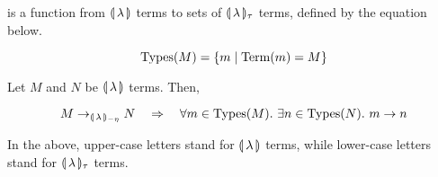 \begin{definition}
   is a function from $\llparenthesis \, \lambda \, \rrparenthesis$ terms to sets of
  $\llparenthesis \, \lambda \, \rrparenthesis_\tau$ terms, defined by the equation below.
  
  $$
  \operatorname{Types}(M) = \{ m \mid \operatorname{Term}(m) = M \}
  $$
\end{definition}

\begin{lemma}
  \label{lem:infinite-chains}
  Let $M$ and $N$ be $\llparenthesis \, \lambda \, \rrparenthesis$ terms. Then,

  $$
  M \to_{{\llparenthesis \, \lambda \, \rrparenthesis_{-\eta}}} N \quad \Rightarrow \quad
  \forall m \in \operatorname{Types}(M).\ \exists n \in \operatorname{Types}(N).\ m \to n
  $$
  
  In the above, upper-case letters stand for $\llparenthesis \, \lambda \, \rrparenthesis$ terms,
  while lower-case letters stand for $\llparenthesis \, \lambda \, \rrparenthesis_\tau$ terms.
\end{lemma}


